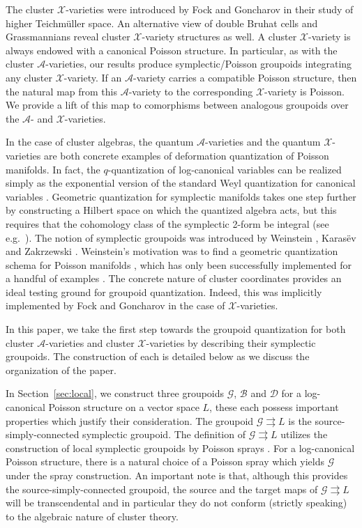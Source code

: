 \documentclass{amsart}
\numberwithin{equation}{section}
\newcommand{\cA}{\mathcal{A}}
\newcommand{\cB}{\mathcal{B}}
\newcommand{\cD}{\mathcal{D}}
\newcommand{\cG}{\mathcal{G}}
\newcommand{\cX}{\mathcal{X}}
\newcommand{\rra}{\rightrightarrows}
\begin{document}
The cluster $\cX$-varieties were introduced by Fock and Goncharov \cite{FG09a} in their study of higher Teichm\"uller space.
An alternative view of double Bruhat cells and Grassmannians reveal cluster $\cX$-variety structures as well.
A cluster $\cX$-variety is always endowed with a canonical Poisson structure.
In particular, as with the cluster $\cA$-varieties, our results produce symplectic/Poisson groupoids integrating any cluster $\cX$-variety.
If an $\cA$-variety carries a compatible Poisson structure, then the natural map from this $\cA$-variety to the corresponding $\cX$-variety is Poisson.
We provide a lift of this map to comorphisms between analogous groupoids over the $\cA$- and $\cX$-varieties.

In the case of cluster algebras, the quantum $\cA$-varieties \cite{BZ05} and the quantum $\cX$-varieties \cite{FG09a} are both concrete examples of deformation quantization of Poisson manifolds.
In fact, the $q$-quantization of log-canonical variables can be realized simply as the exponential version of the standard Weyl quantization for canonical variables \cite{FG09c}.
Geometric quantization for symplectic manifolds takes one step further by constructing a Hilbert space on which the quantized algebra acts, but this requires that the cohomology class of the symplectic 2-form be integral (see e.g.\ \cite{BW97}).
The notion of symplectic groupoids was introduced by Weinstein \cite{Wei87}, Karas\"{e}v \cite{Kar89} and Zakrzewski \cite{Zak90a, Zak90b}.
Weinstein's motivation was to find a geometric quantization schema for Poisson manifolds \cite{Wei91}, which has only been successfully implemented for a handful of examples \cite{Tan06, Haw08, BCST12}.
The concrete nature of cluster coordinates provides an ideal testing ground for groupoid quantization.
Indeed, this was implicitly implemented by Fock and Goncharov \cite{FG09c} in the case of $\cX$-varieties.

In this paper, we take the first step towards the groupoid quantization for both cluster $\cA$-varieties and cluster $\cX$-varieties by describing their symplectic groupoids.
The construction of each is detailed below as we discuss the organization of the paper.

In Section~\ref{sec:local}, we construct three groupoids $\cG$, $\cB$ and $\cD$ for a log-canonical Poisson structure on a vector space $L$, these each possess important properties which justify their consideration.
The groupoid $\cG \rra L$ is the source-simply-connected symplectic groupoid.
The definition of $\cG \rra L$ utilizes the construction of local symplectic groupoids by Poisson sprays \cite{CM11, CMS17}.
For a log-canonical Poisson structure, there is a natural choice of a Poisson spray which yields $\cG$ under the spray construction.
An important note is that, although this provides the source-simply-connected groupoid, the source and the target maps of $\cG \rra L$ will be transcendental and in particular they do not conform (strictly speaking) to the algebraic nature of cluster theory.
\end{document}
